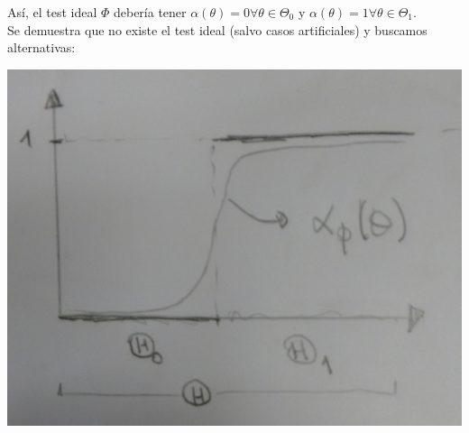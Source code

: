 \documentclass[10pt]{article}
\theoremstyle{plain}
\theoremstyle{definition}
\begin{document}
 Así, el test ideal $\Phi$ debería tener $\alpha(\theta)= 0 \forall \theta \in \Theta_{0}$ y $\alpha(\theta)=1 \forall \theta \in \Theta_{1}$.\\
 Se demuestra que no existe el test ideal (salvo casos artificiales) y buscamos alternativas:
 \begin{center}
 \includegraphics[scale=0.2]{imagenes/test1.jpg}
 \end{center}
\end{document}
